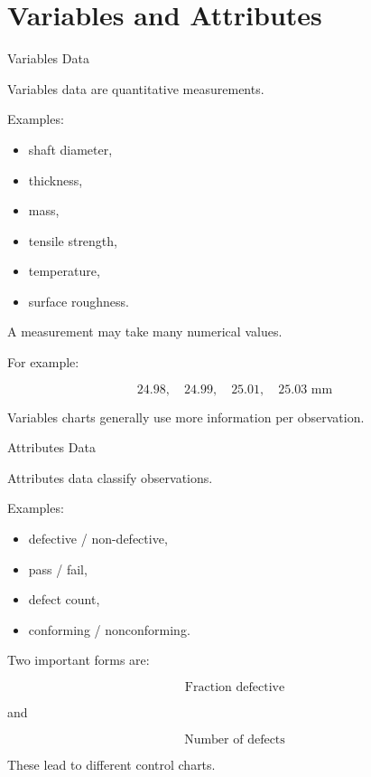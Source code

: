 \documentclass[aspectratio=169,10pt]{beamer}
\begin{document}

\section{Variables and Attributes}

\begin{frame}[shrink=18]{Variables Data}
\small

Variables data are quantitative measurements.

Examples:

\begin{itemize}
    \item shaft diameter,
    \item thickness,
    \item mass,
    \item tensile strength,
    \item temperature,
    \item surface roughness.
\end{itemize}

A measurement may take many numerical values.

For example:

\[
24.98,\quad24.99,\quad25.01,\quad25.03\text{ mm}
\]

Variables charts generally use more information per observation.

\end{frame}


\begin{frame}[shrink=18]{Attributes Data}
\small

Attributes data classify observations.

Examples:

\begin{itemize}
    \item defective / non-defective,
    \item pass / fail,
    \item defect count,
    \item conforming / nonconforming.
\end{itemize}

Two important forms are:

\[
\boxed{
\text{Fraction defective}
}
\]

and

\[
\boxed{
\text{Number of defects}
}
\]

These lead to different control charts.

\end{frame}
\end{document}
